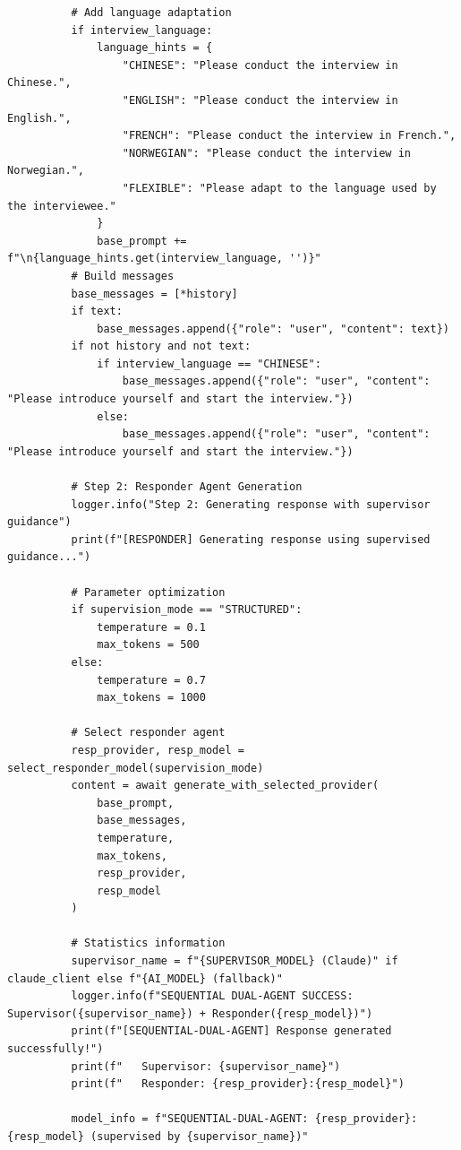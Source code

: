 \documentclass[sigchi,nonacm,manuscript]{acmart}
\begin{document}
\begin{lstlisting}
          # Add language adaptation
          if interview_language:
              language_hints = {
                  "CHINESE": "Please conduct the interview in Chinese.",
                  "ENGLISH": "Please conduct the interview in English.",
                  "FRENCH": "Please conduct the interview in French.",
                  "NORWEGIAN": "Please conduct the interview in Norwegian.",
                  "FLEXIBLE": "Please adapt to the language used by the interviewee."
              }
              base_prompt += f"\n{language_hints.get(interview_language, '')}"
          # Build messages
          base_messages = [*history]
          if text:
              base_messages.append({"role": "user", "content": text})
          if not history and not text:
              if interview_language == "CHINESE":
                  base_messages.append({"role": "user", "content": "Please introduce yourself and start the interview."})
              else:
                  base_messages.append({"role": "user", "content": "Please introduce yourself and start the interview."})
          
          # Step 2: Responder Agent Generation
          logger.info("Step 2: Generating response with supervisor guidance")
          print(f"[RESPONDER] Generating response using supervised guidance...")
          
          # Parameter optimization
          if supervision_mode == "STRUCTURED":
              temperature = 0.1
              max_tokens = 500
          else:
              temperature = 0.7
              max_tokens = 1000
          
          # Select responder agent
          resp_provider, resp_model = select_responder_model(supervision_mode)
          content = await generate_with_selected_provider(
              base_prompt,
              base_messages,
              temperature,
              max_tokens,
              resp_provider,
              resp_model
          )
          
          # Statistics information
          supervisor_name = f"{SUPERVISOR_MODEL} (Claude)" if claude_client else f"{AI_MODEL} (fallback)"
          logger.info(f"SEQUENTIAL DUAL-AGENT SUCCESS: Supervisor({supervisor_name}) + Responder({resp_model})")
          print(f"[SEQUENTIAL-DUAL-AGENT] Response generated successfully!")
          print(f"   Supervisor: {supervisor_name}")
          print(f"   Responder: {resp_provider}:{resp_model}")
          
          model_info = f"SEQUENTIAL-DUAL-AGENT: {resp_provider}:{resp_model} (supervised by {supervisor_name})"
          

\end{lstlisting}
\end{document}
